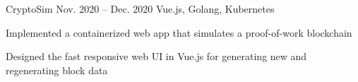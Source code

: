 \begin{cvprojects}
  \cvproject
  {CryptoSim}
  {\href{https://github.com/jzlotek/bc}{\faGithubSquare\acvHeaderIconSep\@KevinIsMyName}}
  {Nov. 2020 -- Dec. 2020}
  {Vue.js, Golang, Kubernetes}
  {
    \begin{cvitems}
      \item Implemented a containerized web app that simulates a proof-of-work blockchain
      \item Designed the fast responsive web UI in Vue.js for generating new and regenerating block data
    \end{cvitems}
  }







\end{cvprojects}
